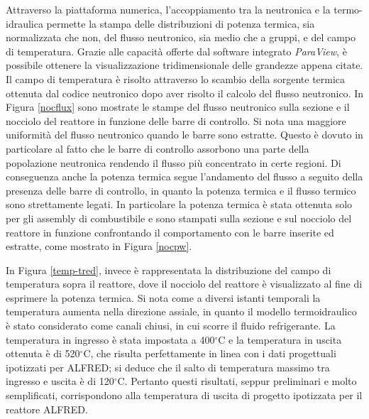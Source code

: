 Attraverso la piattaforma numerica, l'accoppiamento tra la neutronica e la 
termo-idraulica permette la stampa delle distribuzioni di potenza termica, sia 
normalizzata che non, del flusso neutronico, sia medio che a gruppi, e del campo 
di temperatura.
Grazie alle capacità offerte dal software integrato \textit{ParaView}, è possibile 
ottenere la visualizzazione tridimensionale delle grandezze appena citate.
Il campo di temperatura è risolto attraverso lo scambio della sorgente termica 
ottenuta dal codice neutronico dopo aver risolto il calcolo del flusso neutronico.
In Figura \ref{nocflux} sono mostrate le stampe del flusso neutronico sulla 
sezione e il nocciolo del reattore in funzione delle barre di controllo. Si nota 
una maggiore uniformità del flusso neutronico quando le barre sono estratte. 
Questo è dovuto in particolare al fatto che le barre di controllo assorbono una 
parte della popolazione neutronica rendendo il flusso più concentrato in certe 
regioni.
Di conseguenza anche la potenza termica segue l'andamento del flusso a seguito 
della presenza delle barre di controllo, in quanto la potenza termica e il 
flusso termico sono strettamente legati.
In particolare la potenza termica è stata ottenuta solo per gli assembly di 
combustibile e sono stampati sulla sezione e sul nocciolo del reattore in 
funzione confrontando il comportamento con le barre inserite ed estratte, come 
mostrato in Figura \ref{nocpw}.

In Figura \ref{temp-tred}, invece è rappresentata la distribuzione del campo di 
temperatura sopra il reattore, dove il nocciolo del reattore è visualizzato al 
fine di esprimere la potenza termica. Si nota come a diversi istanti temporali la 
temperatura aumenta nella direzione assiale, in quanto il modello termoidraulico 
è stato considerato come canali chiusi, in cui scorre il fluido refrigerante.
La temperatura in ingresso è stata impostata a 400$^\circ$C e la temperatura in 
uscita ottenuta è di 520$^\circ$C, che risulta perfettamente in linea con i dati 
progettuali ipotizzati per ALFRED; si deduce che il salto di temperatura massimo tra 
ingresso e uscita è di 120$^\circ$C.
Pertanto questi risultati, seppur preliminari e molto semplificati, 
corrispondono alla temperatura di uscita di progetto ipotizzata per il reattore 
ALFRED.

